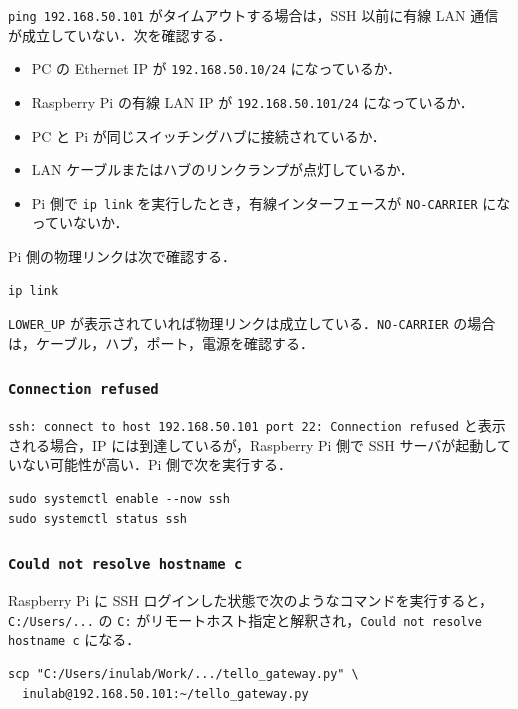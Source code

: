 \texttt{ping 192.168.50.101} がタイムアウトする場合は，SSH 以前に有線 LAN 通信が成立していない．次を確認する．

\begin{itemize}
  \item PC の Ethernet IP が \texttt{192.168.50.10/24} になっているか．
  \item Raspberry Pi の有線 LAN IP が \texttt{192.168.50.101/24} になっているか．
  \item PC と Pi が同じスイッチングハブに接続されているか．
  \item LAN ケーブルまたはハブのリンクランプが点灯しているか．
  \item Pi 側で \texttt{ip link} を実行したとき，有線インターフェースが \texttt{NO-CARRIER} になっていないか．
\end{itemize}

Pi 側の物理リンクは次で確認する．

\begin{lstlisting}
ip link
\end{lstlisting}

\texttt{LOWER\_UP} が表示されていれば物理リンクは成立している．\texttt{NO-CARRIER} の場合は，ケーブル，ハブ，ポート，電源を確認する．

\subsubsection{\texttt{Connection refused}}

\texttt{ssh: connect to host 192.168.50.101 port 22: Connection refused} と表示される場合，IP には到達しているが，Raspberry Pi 側で SSH サーバが起動していない可能性が高い．Pi 側で次を実行する．

\begin{lstlisting}
sudo systemctl enable --now ssh
sudo systemctl status ssh
\end{lstlisting}

\subsubsection{\texttt{Could not resolve hostname c}}

Raspberry Pi に SSH ログインした状態で次のようなコマンドを実行すると，\texttt{C:/Users/...} の \texttt{C:} がリモートホスト指定と解釈され，\texttt{Could not resolve hostname c} になる．

\begin{lstlisting}
scp "C:/Users/inulab/Work/.../tello_gateway.py" \
  inulab@192.168.50.101:~/tello_gateway.py
\end{lstlisting}

